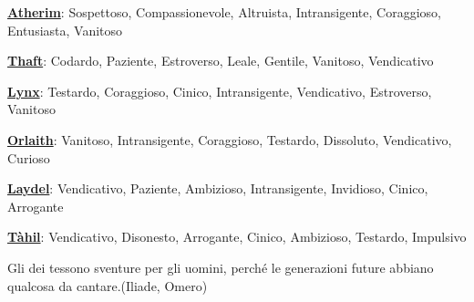 \begin{multicols}{2}
{\smallskip

\textbf{\hyperlink{atherim}{Atherim}}: Sospettoso, Compassionevole, Altruista, Intransigente, Coraggioso, Entusiasta, Vanitoso\

\smallskip

\textbf{\hyperlink{thaft}{Thaft}}: Codardo, Paziente, Estroverso, Leale, Gentile, Vanitoso, Vendicativo

\smallskip

\textbf{\hyperlink{lynx}{Lynx}}: Testardo, Coraggioso, Cinico, Intransigente, Vendicativo, Estroverso, Vanitoso

\smallskip

\textbf{\hyperlink{orlaith}{Orlaith}}: Vanitoso, Intransigente, Coraggioso, Testardo, Dissoluto, Vendicativo, Curioso

\smallskip

\textbf{\hyperlink{laydel}{Laydel}}: Vendicativo, Paziente, Ambizioso, Intransigente, Invidioso, Cinico, Arrogante

\smallskip

\textbf{\hyperlink{tahil}{Tàhil}}: Vendicativo, Disonesto, Arrogante, Cinico, Ambizioso, Testardo, Impulsivo

}

\end{multicols}

\vfill

\begin{enfasi}
	Gli dei tessono sventure per gli uomini, perché le generazioni future abbiano qualcosa da cantare.(Iliade, Omero)
\end{enfasi}




\pagebreak

